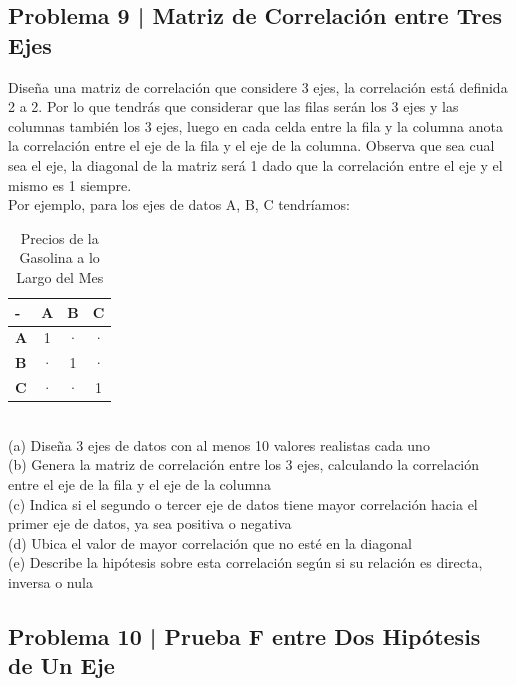 \documentclass{article}
\begin{document}
\clearpage

\subsection*{Problema 9 | Matriz de Correlación entre Tres Ejes}

Diseña una matriz de correlación que considere 3 ejes, la correlación está definida 2 a 2. Por lo que tendrás que considerar que las filas serán los 3 ejes y las columnas también los 3 ejes, luego en cada celda entre la fila y la columna anota la correlación entre el eje de la fila y el eje de la columna. Observa que sea cual sea el eje, la diagonal de la matriz será 1 dado que la correlación entre el eje y el mismo es 1 siempre.
\\[12pt]
Por ejemplo, para los ejes de datos A, B, C tendríamos:
\begin{table}[ht]
    \centering
    \caption{Precios de la Gasolina a lo Largo del Mes}
    \begin{tabular}{|l|c|c|c|}
        \hline
        - & \textbf{A} & \textbf{B} & \textbf{C} \\
        \hline
        \textbf{A} & 1 & · & · \\
        \textbf{B} & · & 1 & · \\
        \textbf{C} & · & · & 1 \\
        \hline
    \end{tabular}
\end{table}
\\
(a) Diseña 3 ejes de datos con al menos 10 valores realistas cada uno
\\[6pt]
(b) Genera la matriz de correlación entre los 3 ejes, calculando la correlación entre el eje de la fila y el eje de la columna
\\[6pt]
(c) Indica si el segundo o tercer eje de datos tiene mayor correlación hacia el primer eje de datos, ya sea positiva o negativa
\\[6pt]
(d) Ubica el valor de mayor correlación que no esté en la diagonal
\\[6pt]
(e) Describe la hipótesis sobre esta correlación según si su relación es directa, inversa o nula

\clearpage

\subsection*{Problema 10 | Prueba F entre Dos Hipótesis de Un Eje}
\end{document}
